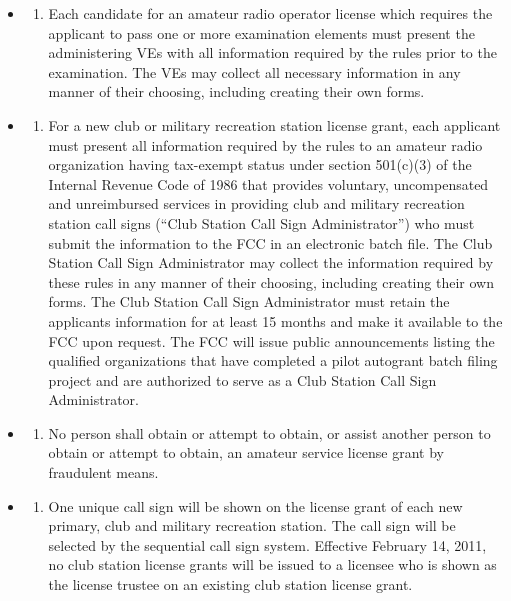 \documentclass[
  letterpaper,
  DIV=11,
  numbers=noendperiod]{scrreport}
\providecommand{\tightlist}{%
  \setlength{\itemsep}{0pt}\setlength{\parskip}{0pt}}\usepackage{longtable,booktabs,array}
\begin{document}
\begin{itemize}
\item
  \begin{enumerate}
  \def\labelenumi{(\arabic{enumi})}
  \tightlist
  \item
    Each candidate for an amateur radio operator license which requires
    the applicant to pass one or more examination elements must present
    the administering VEs with all information required by the rules
    prior to the examination. The VEs may collect all necessary
    information in any manner of their choosing, including creating
    their own forms.
  \end{enumerate}
\item
  \begin{enumerate}
  \def\labelenumi{(\arabic{enumi})}
  \setcounter{enumi}{1}
  \tightlist
  \item
    For a new club or military recreation station license grant, each
    applicant must present all information required by the rules to an
    amateur radio organization having tax-exempt status under section
    501(c)(3) of the Internal Revenue Code of 1986 that provides
    voluntary, uncompensated and unreimbursed services in providing club
    and military recreation station call signs (``Club Station Call Sign
    Administrator'') who must submit the information to the FCC in an
    electronic batch file. The Club Station Call Sign Administrator may
    collect the information required by these rules in any manner of
    their choosing, including creating their own forms. The Club Station
    Call Sign Administrator must retain the applicants information for
    at least 15 months and make it available to the FCC upon request.
    The FCC will issue public announcements listing the qualified
    organizations that have completed a pilot autogrant batch filing
    project and are authorized to serve as a Club Station Call Sign
    Administrator.
  \end{enumerate}
\item
  \begin{enumerate}
  \def\labelenumi{(\alph{enumi})}
  \setcounter{enumi}{2}
  \tightlist
  \item
    No person shall obtain or attempt to obtain, or assist another
    person to obtain or attempt to obtain, an amateur service license
    grant by fraudulent means.
  \end{enumerate}
\item
  \begin{enumerate}
  \def\labelenumi{(\alph{enumi})}
  \setcounter{enumi}{3}
  \tightlist
  \item
    One unique call sign will be shown on the license grant of each new
    primary, club and military recreation station. The call sign will be
    selected by the sequential call sign system. Effective February 14,
    2011, no club station license grants will be issued to a licensee
    who is shown as the license trustee on an existing club station
    license grant.
  \end{enumerate}
\end{itemize}
\end{document}
